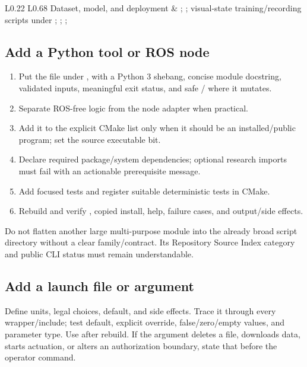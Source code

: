 \begin{longtable}{L{0.22\textwidth} L{0.68\textwidth}}
Dataset, model, and deployment & ; ; visual-state training/recording scripts under ; ; ;  \\
\bottomrule
\end{longtable}

\subsection{Add a Python tool or ROS node}

\begin{enumerate}
  \item Put the file under , with a
        Python 3 shebang, concise module docstring, validated inputs, meaningful
        exit status, and safe / where it mutates.
  \item Separate ROS-free logic from the node adapter when practical.
  \item Add it to the explicit CMake  list only when it
        should be an installed/public program; set the source executable bit.
  \item Declare required package/system dependencies; optional research imports
        must fail with an actionable prerequisite message.
  \item Add focused tests and register suitable deterministic tests in CMake.
  \item Rebuild and verify , copied install, help,
        failure cases, and output/side effects.
\end{enumerate}

Do not flatten another large multi-purpose module into the already broad script
directory without a clear family/contract. Its Repository Source Index category
and public CLI status must remain understandable.

\subsection{Add a launch file or argument}

Define units, legal choices, default, and side effects. Trace it through every
wrapper/include; test default, explicit override, false/zero/empty values, and
parameter type. Use  after rebuild. If the argument deletes a
file, downloads data, starts actuation, or alters an authorization boundary,
state that before the operator command.

